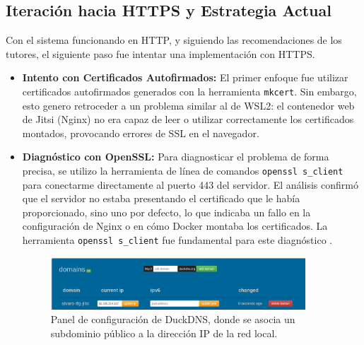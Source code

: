 \subsection{Iteración hacia HTTPS y Estrategia Actual}
Con el sistema funcionando en HTTP, y siguiendo las recomendaciones de los tutores, el siguiente paso fue intentar una implementación con HTTPS.
\begin{itemize}
    \item \textbf{Intento con Certificados Autofirmados:} El primer enfoque fue utilizar certificados autofirmados generados con la herramienta \texttt{mkcert}. Sin embargo, esto genero retroceder a un problema similar al de WSL2: el contenedor web de Jitsi (Nginx) no era capaz de leer o utilizar correctamente los certificados montados, provocando errores de SSL en el navegador.
    
    \item \textbf{Diagnóstico con OpenSSL:} Para diagnosticar el problema de forma precisa, se utilizo la herramienta de línea de comandos \texttt{openssl s\_client} para conectarme directamente al puerto 443 del servidor. El análisis confirmó que el servidor no estaba presentando el certificado que le había proporcionado, sino uno por defecto, lo que indicaba un fallo en la configuración de Nginx o en cómo Docker montaba los certificados. La herramienta \texttt{openssl s\_client} fue fundamental para este diagnóstico \cite{openssl_docs}.

    \begin{figure}[H]
    \centering
    \includegraphics[width=0.9\textwidth]{img/duckdns.png}
    \caption{Panel de configuración de DuckDNS, donde se asocia un subdominio público a la dirección IP de la red local.}
    \label{fig:config_duckdns}
\end{figure}


\end{itemize}
